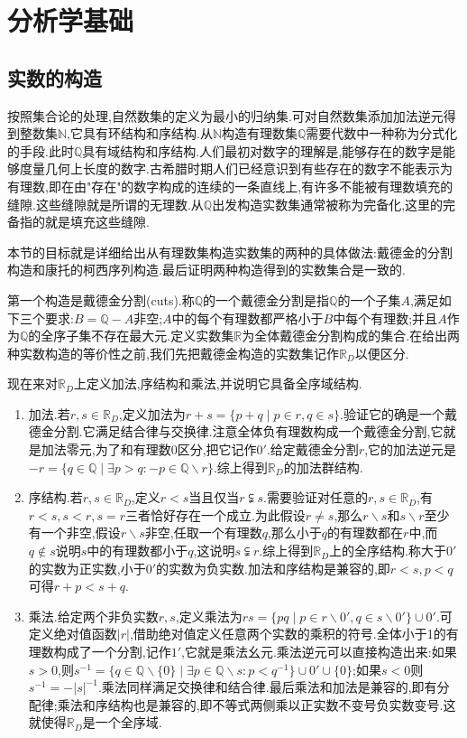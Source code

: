 \chapter{分析学基础}
\section{实数的构造}

按照集合论的处理,自然数集的定义为最小的归纳集.可对自然数集添加加法逆元得到整数集$\mathbb{N}$,它具有环结构和序结构.从$\mathbb{N}$构造有理数集$\mathbb{Q}$需要代数中一种称为分式化的手段.此时$\mathbb{Q}$具有域结构和序结构.人们最初对数字的理解是,能够存在的数字是能够度量几何上长度的数字.古希腊时期人们已经意识到有些存在的数字不能表示为有理数,即在由"存在"的数字构成的连续的一条直线上,有许多不能被有理数填充的缝隙.这些缝隙就是所谓的无理数.从$\mathbb{Q}$出发构造实数集通常被称为完备化,这里的完备指的就是填充这些缝隙.

本节的目标就是详细给出从有理数集构造实数集的两种的具体做法:戴德金的分割构造和康托的柯西序列构造.最后证明两种构造得到的实数集合是一致的.

第一个构造是戴德金分割(cuts).称$\mathbb{Q}$的一个戴德金分割是指$\mathbb{Q}$的一个子集$A$,满足如下三个要求:$B=\mathbb{Q}-A$非空;$A$中的每个有理数都严格小于$B$中每个有理数;并且$A$作为$\mathbb{Q}$的全序子集不存在最大元.定义实数集$\mathbb{R}$为全体戴德金分割构成的集合.在给出两种实数构造的等价性之前,我们先把戴德金构造的实数集记作$\mathbb{R}_D$以便区分.

现在来对$\mathbb{R}_D$上定义加法,序结构和乘法,并说明它具备全序域结构.
\begin{enumerate}
	\item 加法.若$r,s\in\mathbb{R}_D$,定义加法为$r+s=\{p+q\mid p\in r,q\in s\}$.验证它的确是一个戴德金分割.它满足结合律与交换律.注意全体负有理数构成一个戴德金分割,它就是加法零元,为了和有理数0区分,把它记作$0'$.给定戴德金分割$r$,它的加法逆元是$-r=\{q\in\mathbb{Q}\mid \exists p>q:-p\in\mathbb{Q}\backslash r\}$.综上得到$\mathbb{R}_D$的加法群结构.
	\item 序结构.若$r,s\in\mathbb{R}_D$,定义$r<s$当且仅当$r\subsetneqq s$.需要验证对任意的$r,s\in\mathbb{R}_D$,有$r<s,s<r,s=r$三者恰好存在一个成立.为此假设$r\not=s$,那么$r\backslash s$和$s\backslash r$至少有一个非空,假设$r\backslash s$非空,任取一个有理数$q$,那么小于$q$的有理数都在$r$中,而$q\not\in s$说明$s$中的有理数都小于$q$,这说明$s\subsetneqq r$.综上得到$\mathbb{R}_D$上的全序结构.称大于$0'$的实数为正实数,小于$0'$的实数为负实数.加法和序结构是兼容的,即$r<s,p<q$可得$r+p<s+q$.
	\item 乘法.给定两个非负实数$r,s$,定义乘法为$rs=\{pq\mid p\in r\backslash 0',q\in s\backslash 0'\}\cup 0'$.可定义绝对值函数$|r|$,借助绝对值定义任意两个实数的乘积的符号.全体小于1的有理数构成了一个分割,记作$1'$,它就是乘法幺元.乘法逆元可以直接构造出来:如果$s>0$,则$s^{-1}=\{q\in\mathbb{Q}\backslash\{0\}\mid\exists p\in\mathbb{Q}\backslash s:p<q^{-1}\}\cup 0'\cup\{0\}$;如果$s<0$则$s^{-1}=-|s|^{-1}$.乘法同样满足交换律和结合律.最后乘法和加法是兼容的,即有分配律;乘法和序结构也是兼容的,即不等式两侧乘以正实数不变号负实数变号.这就使得$\mathbb{R}_D$是一个全序域.
\end{enumerate}


